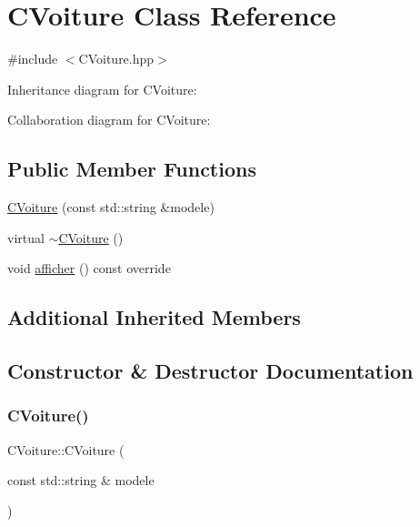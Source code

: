\hypertarget{classCVoiture}{}\section{C\+Voiture Class Reference}
\label{classCVoiture}


{\ttfamily \#include $<$C\+Voiture.\+hpp$>$}



Inheritance diagram for C\+Voiture\+:


Collaboration diagram for C\+Voiture\+:
\subsection*{Public Member Functions}
\begin{DoxyCompactItemize}
\item 
\hyperlink{classCVoiture_ae37a64af5668827a9e7fd7c4e2251c04}{C\+Voiture} (const std\+::string \&modele)
\item 
virtual \hyperlink{classCVoiture_a35c99dadefbf269daba764cbe01488a1}{$\sim$\+C\+Voiture} ()
\item 
void \hyperlink{classCVoiture_a0dd704fa1e172f461950f7f21a7ce21e}{afficher} () const override
\end{DoxyCompactItemize}
\subsection*{Additional Inherited Members}


\subsection{Constructor \& Destructor Documentation}
\mbox{\label{classCVoiture_ae37a64af5668827a9e7fd7c4e2251c04}} 
\subsubsection{\texorpdfstring{C\+Voiture()}{CVoiture()}}
{\footnotesize\ttfamily C\+Voiture\+::\+C\+Voiture (\begin{DoxyParamCaption}\item[{const std\+::string \&}]{modele }\end{DoxyParamCaption})}

\mbox{\label{classCVoiture_a35c99dadefbf269daba764cbe01488a1}} 
